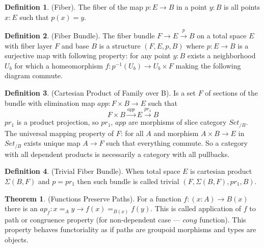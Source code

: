 \documentclass{article}
\theoremstyle{definition}
\newtheorem{theorem}{Theorem}
\newtheorem{definition}{Definition}
\begin{document}
\begin{definition} (Fiber).
The fiber of the map $p: E \rightarrow B$ in a point $y: B$ is all points $x: E$ such that $p(x)=y$.
\end{definition}

\begin{definition} (Fiber Bundle).
The fiber bundle $ F \rightarrow E \xrightarrow{p} B$ on a total space $E$ with fiber layer $F$ and base $B$ is a
structure $(F,E,p,B)$ where $p: E \rightarrow B$ is a surjective map with following property:
for any point $y: B$ exists a neighborhood $U_b$ for which a homeomorphism $f: p^{-1}(U_b) \rightarrow U_b \times F$
making the following diagram commute.
\begin{center}
\end{center}
\end{definition}

\begin{definition} (Cartesian Product of Family over B).
Is a set $F$ of sections of the bundle with elimination map $app : F \times B \rightarrow E$ such that
\begin{equation}
F \times B \xrightarrow{app} E \xrightarrow{pr_1} B
\end{equation}
$pr_1$ is a product projection, so $pr_1$, $app$ are morphisms
of slice category $Set_{/B}$. The universal mapping property of $F$:
for all $A$ and morphism $A \times B \rightarrow E$ in $Set_{/B}$ exists
unique map $A \rightarrow F$ such that everything commute. So a category
with all dependent products is necessarily a category with all pullbacks.
\end{definition}

\begin{definition} (Trivial Fiber Bundle).
When total space $E$ is cartesian product $\Sigma(B,F)$ and $p = pr_1$
then such bundle is called trivial $(F,\Sigma(B,F),pr_1,B)$.
\end{definition}

\begin{theorem} (Functions Preserve Paths).
For a function $f: (x:A) \rightarrow B(x)$
there is an $ap_f : x =_A y \rightarrow f(x) =_{B(x)} f(y)$. This is called
application of $f$ to path or congruence property (for non-dependent case ---
$cong$ function). This property behaves functoriality
as if paths are groupoid morphisms and types are objects.
\end{theorem}
\end{document}
